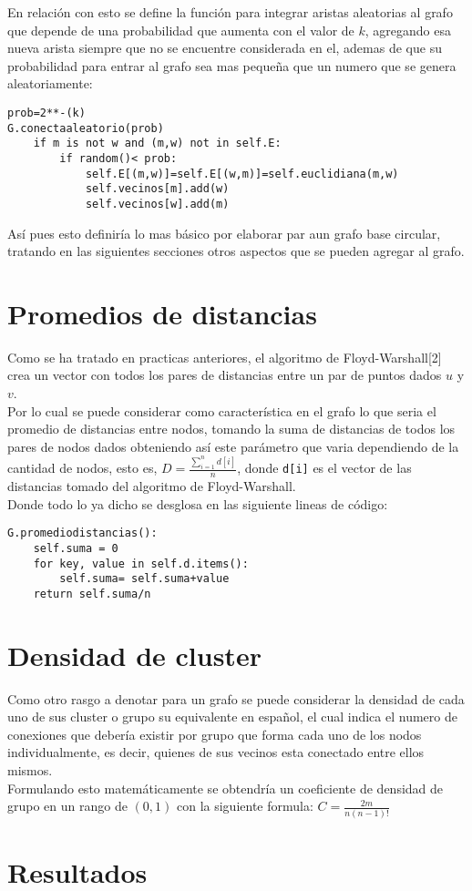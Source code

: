 \documentclass[12pt]{article}
\begin{document}
En relación con esto se define la función para integrar aristas aleatorias al grafo que depende de una probabilidad que aumenta con el valor de $k$, agregando esa nueva arista siempre que no se encuentre considerada en el, ademas de que su probabilidad para entrar al grafo sea mas pequeña que un numero que se genera aleatoriamente:
\begin{lstlisting}[style=tt]
prob=2**-(k)
G.conectaaleatorio(prob)
	if m is not w and (m,w) not in self.E:
		if random()< prob:
			self.E[(m,w)]=self.E[(w,m)]=self.euclidiana(m,w)
			self.vecinos[m].add(w)
			self.vecinos[w].add(m)
\end{lstlisting}
Así pues esto definiría lo mas básico por elaborar par aun grafo base circular, tratando en las siguientes secciones otros aspectos que se pueden agregar al grafo.
\section{Promedios de distancias}
Como se ha tratado en practicas anteriores, el algoritmo de Floyd-Warshall[2] crea un vector con todos los pares de distancias entre un par de puntos dados $u$ y $v$.\\
Por lo cual se puede considerar como característica en el grafo lo que seria el promedio de distancias entre nodos, tomando la suma de distancias de todos los pares de nodos dados obteniendo así este parámetro que varia dependiendo de la cantidad de nodos, esto es, $D= \frac{\sum_{i=1}^n d[i]}{n}$, donde \texttt{d[i]} es el vector de las distancias tomado del algoritmo de Floyd-Warshall.\\ Donde todo lo ya dicho se desglosa en las siguiente lineas de código:
\begin{lstlisting}[style=tt]
G.promediodistancias():
	self.suma = 0
	for key, value in self.d.items():
		self.suma= self.suma+value
	return self.suma/n
\end{lstlisting}
\section{Densidad de cluster}
Como otro rasgo a denotar para un grafo se puede considerar la densidad de cada uno de sus cluster o grupo su equivalente en español, el cual indica el numero de conexiones que debería existir por grupo que forma cada uno de los nodos individualmente, es decir, quienes de sus vecinos esta conectado entre ellos mismos.\\
Formulando esto matemáticamente se obtendría un coeficiente de densidad de grupo en un rango de $(0,1)$ con la siguiente formula: $C=\frac{2m}{n(n-1)!}$
\section{Resultados}
\end{document}
